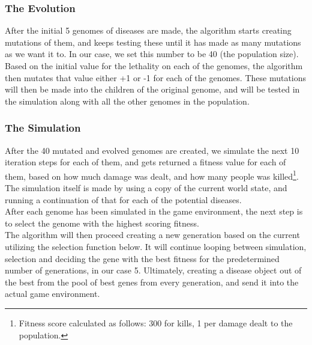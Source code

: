\documentclass[conference,compsoc]{IEEEtran}
\begin{document}
\subsubsection{The Evolution}
After the initial 5 genomes of diseases are made, the algorithm starts creating mutations of them, and keeps testing these until it has made as many mutations as we want it to. In our 	case, we set this number to be 40 (the population size).\\
Based on the initial value for the lethality on each of the genomes, the algorithm then mutates that value either +1 or -1 for each of the genomes. These mutations will then be made into the children of the original genome, and will be tested in the simulation along with all the other genomes in the population.\\

\subsubsection{The Simulation}
After the 40 mutated and evolved genomes are created, we simulate the next 10 iteration steps for each of them, and gets returned a fitness value for each of them, based on how much damage was dealt, and how many people was killed\footnote{Fitness score calculated as follows: 300 for kills, 1 per damage dealt to the population.}.\\
The simulation itself is made by using a copy of the current world state, and running a continuation of that for each of the potential diseases.\\
After each genome has been simulated in the game environment, the next step is to select the genome with the highest scoring fitness.\\
The algorithm will then proceed creating a new generation based on the current utilizing the selection function below. It will continue looping between simulation, selection and deciding the gene with the best fitness for the predetermined number of generations, in our case 5. Ultimately, creating a disease object out of the best from the pool of best genes from every generation, and send it into the actual game environment.\\
\end{document}
